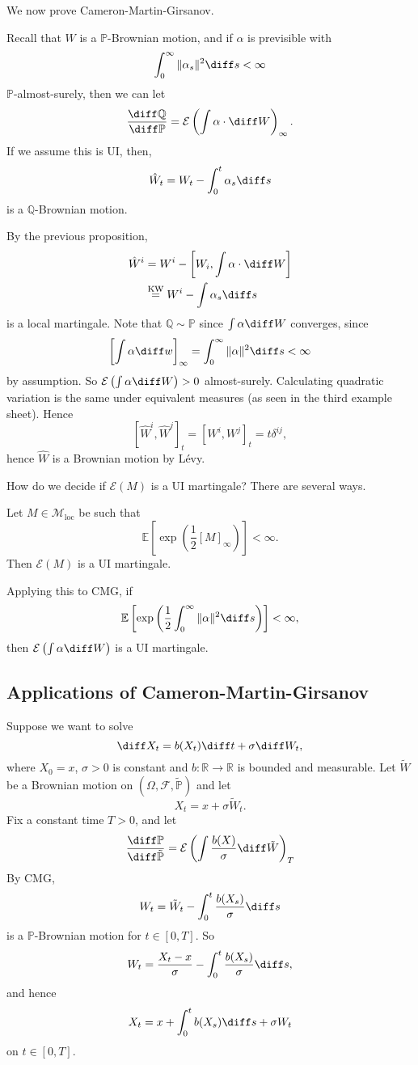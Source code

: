 \documentclass[12pt]{article}
\begin{document}
We now prove Cameron-Martin-Girsanov.

\begin{proofbox}
	Recall that $W$ is a $\mathbb{P}$-Brownian motion, and if $\alpha$ is previsible with
	\[
	\int_0^{\infty} \|\alpha_s\|^2 \diff s < \infty
	\]
	$\mathbb{P}$-almost-surely, then we can let
	\[
	\frac{\diff \mathbb{Q}}{\diff \mathbb{P}} = \mathcal{E} \left( \int \alpha \cdot \diff W \right)_\infty.
	\]
	If we assume this is UI, then,
	\[
	\hat W_t = W_t - \int_0^{t} \alpha_s \diff s
	\]
	is a $\mathbb{Q}$-Brownian motion.

	By the previous proposition,
	\begin{align*}
		\hat W^{i} &= W^{i} - \left[ W_i, \int \alpha \cdot \diff W \right] \\
			   &\overset{\mathrm{KW}}= W^{i} - \int \alpha_{s} \diff s
	\end{align*}
	is a local martingale. Note that $\mathbb{Q} \sim \mathbb{P}$ since $\int \alpha \diff W$ converges, since
	\[
		\left[ \int \alpha \diff w \right]_\infty = \int_0^{\infty}\|\alpha\|^2 \diff s < \infty
	\]
	by assumption. So $\mathcal{E} \left( \int \alpha \diff W \right) > 0$ almost-surely. Calculating quadratic variation is the same under equivalent measures (as seen in the third example sheet). Hence
	\[
		[ \hat W^i, \hat W^j]_t = [ W^i, W^j]_t = t \delta^{ij},
	\]
	hence $\hat W$ is a Brownian motion by L\'evy.
\end{proofbox}

How do we decide if $\mathcal{E}(M)$ is a UI martingale? There are several ways.

\begin{proposition}[Novikov]
	Let $M \in \mathcal{M}_{\mathrm{loc}}$ be such that
	\[
		\mathbb{E}\left[ \exp\left( \frac 12 [M]_\infty \right) \right] < \infty.
	\]
	Then $\mathcal{E}(M)$ is a UI martingale.
\end{proposition}

Applying this to CMG, if
\[
\mathbb{E}\left[ \exp \left( \frac12 \int_0^{\infty} \|\alpha\|^2 \diff s \right) \right] < \infty,
\]
then $\mathcal{E}\left( \int \alpha \diff W \right)$ is a UI martingale.

\subsection{Applications of Cameron-Martin-Girsanov}%
\label{sub:acmg}

Suppose we want to solve
\[
\diff X_t = b(X_t) \diff t + \sigma \diff W_t,
\]
where $X_0 = x$, $\sigma > 0$ is constant and $b : \mathbb{R} \to \mathbb{R}$ is bounded and measurable. Let $\tilde W$ be a Brownian motion on $(\Omega, \mathcal{F}, \tilde{\mathbb{P}})$ and let
\[
X_t = x + \sigma \tilde W_t.
\]
Fix a constant time $T > 0$, and let
\[
	\frac{\diff \mathbb{P}}{\diff \tilde{\mathbb{P}}} = \mathcal{E} \left( \int \frac{b(X)}{\sigma} \diff \tilde W \right)_T
\]
By CMG,
\[
W_t = \tilde W_t - \int_0^{t} \frac{b(X_s)}{\sigma} \diff s
\]
is a $\mathbb{P}$-Brownian motion for $t \in [0, T]$. So
\[
W_t = \frac{X_t - x}{\sigma} - \int_0^{t} \frac{b(X_s)}{\sigma} \diff s,
\]
and hence
\[
X_t = x + \int_0^{t} b(X_s) \diff s + \sigma W_t
\]
on $t \in [0, T]$.
\end{document}
